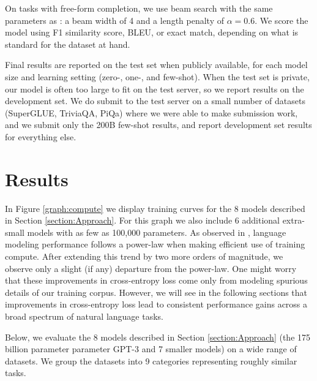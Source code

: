 On tasks with free-form completion, we use beam search with the same parameters as \cite{raffel2019t5}: a beam width of 4 and a length penalty of $\alpha = 0.6$.  We score the model using F1 similarity score, BLEU, or exact match, depending on what is standard for the dataset at hand.

Final results are reported on the test set when publicly available, for each model size and learning setting (zero-, one-, and few-shot).  When the test set is private, our model is often too large to fit on the test server, so we report results on the development set.  We do submit to the test server on a small number of datasets (SuperGLUE, TriviaQA, PiQa) where we were able to make submission work, and we submit only the 200B few-shot results, and report development set results for everything else. 

\section{Results}
\label{section:Results}

In Figure \ref{graph:compute} we display training curves for the 8 models described in Section \ref{section:Approach}. For this graph we also include 6 additional extra-small models with as few as 100,000 parameters. As observed in \cite{kaplan2020scaling}, language modeling performance follows a power-law when making efficient use of training compute. After extending this trend by two more orders of magnitude, we observe only a slight (if any) departure from the power-law. One might worry that these improvements in cross-entropy loss come only from modeling spurious details of our training corpus. However, we will see in the following sections that improvements in cross-entropy loss lead to consistent performance gains across a broad spectrum of natural language tasks.

Below, we evaluate the 8 models described in Section \ref{section:Approach} (the 175 billion parameter parameter GPT-3 and 7 smaller models) on a wide range of datasets. We group the datasets into 9 categories representing roughly similar tasks.  


